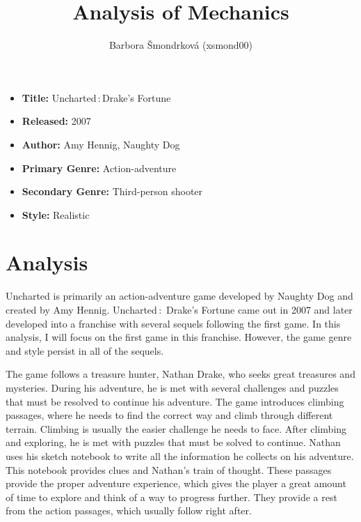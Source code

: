 \documentclass[a4paper,10pt,english]{article}
\title{%
Analysis of Mechanics%
}
\author{%
Barbora Šmondrková (xsmond00)%
}
\date{}
\begin{document}
\maketitle
\thispagestyle{empty}

{%
\large

\begin{itemize}

\item[] \textbf{Title:} Uncharted\,:\,Drake's Fortune

\item[] \textbf{Released:} 2007

\item[] \textbf{Author:} Amy Hennig, Naughty Dog

\item[] \textbf{Primary Genre:} Action-adventure

\item[] \textbf{Secondary Genre:} Third-person shooter

\item[] \textbf{Style:} Realistic

\end{itemize}

}

\section*{\centering Analysis}

Uncharted is primarily an action-adventure game developed by Naughty Dog and created by Amy Hennig. Uncharted\,:\, Drake's Fortune came out in 2007 and later developed into a franchise with several sequels following the first game. In this analysis, I will focus on the first game in this franchise. However, the game genre and style persist in all of the sequels. 

The game follows a treasure hunter, Nathan Drake, who seeks great treasures and mysteries. During his adventure, he is met with several challenges and puzzles that must be resolved to continue his adventure. The game introduces climbing passages, where he needs to find the correct way and climb through different terrain. Climbing is usually the easier challenge he needs to face. After climbing and exploring, he is met with puzzles that must be solved to continue. Nathan uses his sketch notebook to write all the information he collects on his adventure. This notebook provides clues and Nathan's train of thought. These passages provide the proper adventure experience, which gives the player a great amount of time to explore and think of a way to progress further. They provide a rest from the action passages, which usually follow right after.
\end{document}
